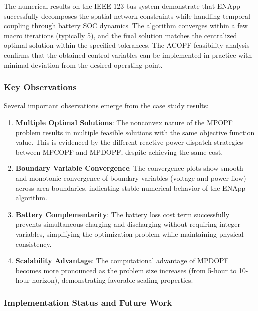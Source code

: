 The numerical results on the IEEE 123 bus system demonstrate that ENApp successfully decomposes the spatial network constraints while handling temporal coupling through battery SOC dynamics. The algorithm converges within a few macro iterations (typically 5), and the final solution matches the centralized optimal solution within the specified tolerances. The ACOPF feasibility analysis confirms that the obtained control variables can be implemented in practice with minimal deviation from the desired operating point.

\subsubsection{Key Observations}

Several important observations emerge from the case study results:

\begin{enumerate}
    \item \textbf{Multiple Optimal Solutions}: The nonconvex nature of the MPOPF problem results in multiple feasible solutions with the same objective function value. This is evidenced by the different reactive power dispatch strategies between MPCOPF and MPDOPF, despite achieving the same cost.
    
    \item \textbf{Boundary Variable Convergence}: The convergence plots show smooth and monotonic convergence of boundary variables (voltage and power flow) across area boundaries, indicating stable numerical behavior of the ENApp algorithm.
    
    \item \textbf{Battery Complementarity}: The battery loss cost term successfully prevents simultaneous charging and discharging without requiring integer variables, simplifying the optimization problem while maintaining physical consistency.
    
    \item \textbf{Scalability Advantage}: The computational advantage of MPDOPF becomes more pronounced as the problem size increases (from 5-hour to 10-hour horizon), demonstrating favorable scaling properties.
\end{enumerate}

\subsubsection{Implementation Status and Future Work}

